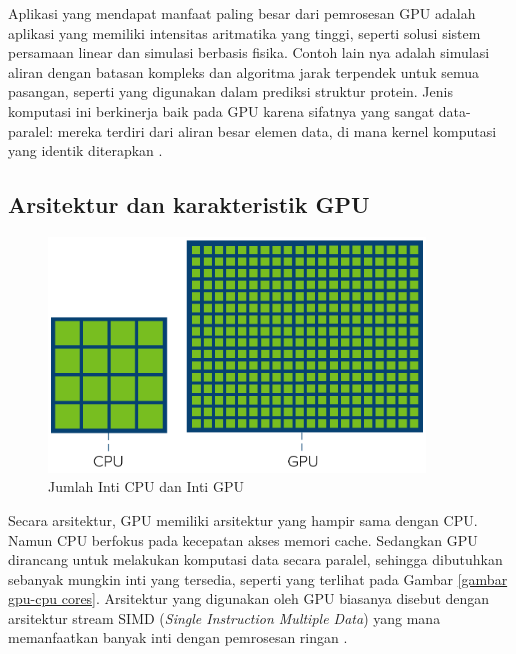 Aplikasi yang mendapat manfaat paling besar dari pemrosesan GPU adalah aplikasi
yang memiliki intensitas aritmatika yang tinggi, seperti solusi sistem
persamaan linear dan simulasi berbasis fisika. Contoh lain nya adalah simulasi
aliran dengan batasan kompleks dan algoritma jarak terpendek untuk semua
pasangan, seperti yang digunakan dalam prediksi struktur protein. Jenis
komputasi ini berkinerja baik pada GPU karena sifatnya yang sangat
data-paralel: mereka terdiri dari aliran besar elemen data, di mana kernel
komputasi yang identik diterapkan \citep{pharrGPUGemsProgramming2005}.

\subsection{Arsitektur dan karakteristik GPU}


\begin{figure}[H]
  \centering
  \includegraphics[width=10cm]{images/cpu-vs-gpu-cores.png}
  \caption{Jumlah Inti CPU dan Inti GPU}
  \label{gambar gpu-cpu cores}
\end{figure}

Secara arsitektur, GPU memiliki arsitektur yang hampir sama dengan CPU. Namun
CPU berfokus pada kecepatan akses memori cache. Sedangkan GPU dirancang untuk
melakukan komputasi data secara paralel, sehingga dibutuhkan sebanyak mungkin
inti yang tersedia, seperti yang terlihat pada Gambar \ref{gambar gpu-cpu
  cores}. Arsitektur yang digunakan oleh GPU biasanya disebut dengan arsitektur
stream SIMD (\emph{Single Instruction Multiple Data}) yang mana memanfaatkan
banyak inti dengan pemrosesan ringan \citep{helenGPUArchitectureStructure2020}.



